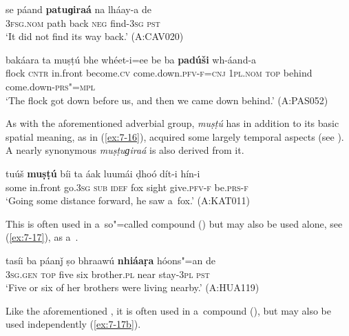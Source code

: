 \ea
\label{ex:7-14}
\gll se páand \textbf{patuɡiraá} na lháay-a de  \\
\textsc{3fsg.nom} path back  \textsc{neg} find-\textsc{3sg} \textsc{pst}\\
\glt `It did not find its way back.' (A:CAV020)

\ex
\label{ex:7-15}
\gll bakáara ta muṣṭú bhe whéet-i=ee  be ba \textbf{padúši} wh-áand-a \\
flock \textsc{cntr} in.front become.\textsc{cv} come.down.\textsc{pfv-f=cnj} \textsc{1pl.nom} \textsc{top} behind come.down-\textsc{prs"=mpl}\\
\glt `The flock got down before us, and then we came down behind.' (A:PAS052)
\z

 As with the aforementioned adverbial group, \textit{muṣṭú} has in addition to its basic spatial meaning, as in (\ref{ex:7-16}), acquired some largely temporal aspects (see ). A nearly synonymous \textit{muṣṭuɡiraá} is also derived from it. 

\begin{exe}
\ex
\label{ex:7-16}
\gll tuúš \textbf{muṣṭú} bíi ta áak luumái ḍhoó dít-i hín-i \\
some in.front go.\textsc{3sg} \textsc{sub} \textsc{idef} fox sight give.\textsc{pfv-f} be.\textsc{prs-f}\\
\glt `Going some distance forward, he saw a~fox.' (A:KAT011)
\end{exe}

 This  is often used in a~so"=called compound  () but may also be used alone, see (\ref{ex:7-17}), as a~.
\begin{exe}
\ex
\label{ex:7-17}
\gll tasíi ba páanǰ ṣo bhraawú \textbf{nhiáaṛa} hóons"=an de \\
\textsc{3sg.gen} \textsc{top} five six brother.\textsc{pl} near stay-\textsc{3pl} \textsc{pst}\\
\glt `Five or six of her brothers were living nearby.' (A:HUA119)
\end{exe}

 Like the aforementioned , it is often used in a~compound  (), but may also be used independently (\ref{ex:7-17b}).

